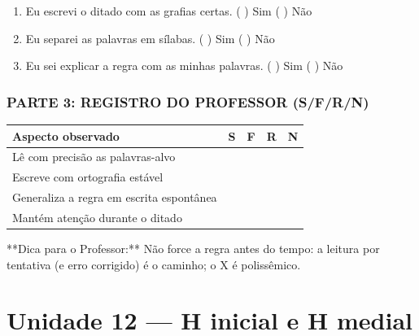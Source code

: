 \begin{exercicio}
\begin{enumerate}[label=\alph*)]
  \item Eu escrevi o ditado com as grafias certas.  \quad ( ) Sim   ( ) Não

  \item Eu separei as palavras em sílabas.  \quad ( ) Sim   ( ) Não

  \item Eu sei explicar a regra com as minhas palavras.  \quad ( ) Sim   ( ) Não

\end{enumerate}

\subsection*{PARTE 3: REGISTRO DO PROFESSOR (S/F/R/N)}

\begin{center}
\renewcommand{\arraystretch}{1.4}
\begin{tabular}{@{}p{9cm}cccc@{}}
\toprule
Aspecto observado & S & F & R & N \\
\midrule
Lê com precisão as palavras-alvo & & & & \\
Escreve com ortografia estável & & & & \\
Generaliza a regra em escrita espontânea & & & & \\
Mantém atenção durante o ditado & & & & \\
\bottomrule\end{tabular}\end{center}

\end{exercicio}

\begin{dica}
**Dica para o Professor:** Não force a regra antes do tempo: a leitura por tentativa (e erro corrigido) é o caminho; o X é polissêmico.
\end{dica}


\chapter{Unidade 12 --- H inicial e H medial}


